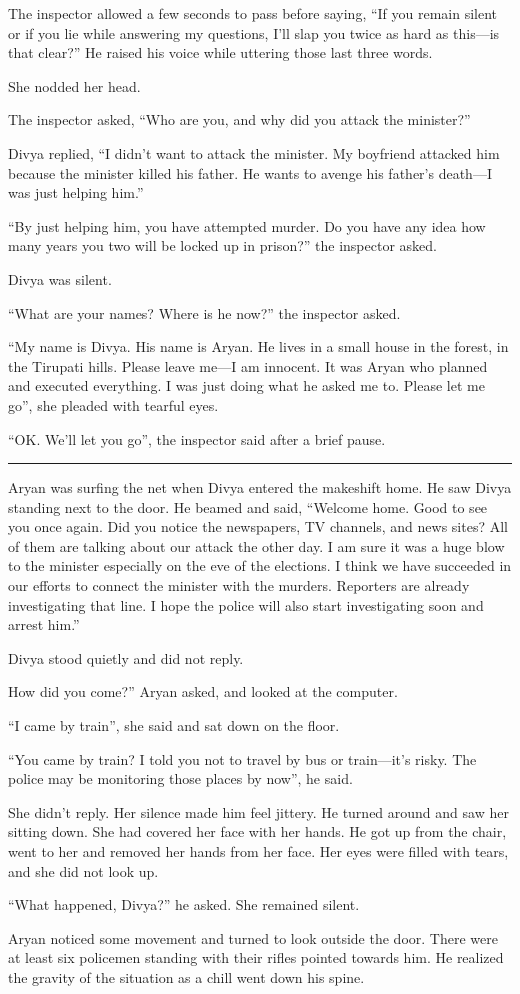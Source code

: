 The inspector allowed a few seconds to pass before saying, “If you remain
silent or if you lie while answering my questions, I'll slap you twice as hard
as this—is that clear?” He raised his voice while uttering those last three
words.

She nodded her head.

The inspector asked, “Who are you, and why did you attack the minister?”

Divya replied, “I didn't want to attack the minister. My boyfriend attacked him
because the minister killed his father. He wants to avenge his father's death—I
was just helping him.”

“By just helping him, you have attempted murder. Do you have any idea how many
years you two will be locked up in prison?” the inspector asked.

Divya was silent.

“What are your names? Where is he now?” the inspector asked.

“My name is Divya. His name is Aryan. He lives in a small house in the forest, in
the Tirupati hills. Please leave me—I am innocent. It was Aryan who planned
and executed everything. I was just doing what he asked me to. Please let me
go”, she pleaded with tearful eyes.

“OK. We'll let you go”, the inspector said after a brief pause.

\fancybreak{* * *}

Aryan was surfing the net when Divya entered the makeshift home. He saw Divya
standing next to the door. He beamed and said, “Welcome home. Good to see you
once again. Did you notice the newspapers, TV channels, and news sites? All of
them are talking about our attack the other day. I am sure it was a huge blow
to the minister especially on the eve of the elections. I think we have succeeded in our
efforts to connect the minister with the murders. Reporters are already
investigating that line. I hope the police will also start investigating soon
and arrest him.”

Divya stood quietly and did not reply.

How did you come?” Aryan asked, and looked at the computer.

“I came by train”, she said and sat down on the floor.

“You came by train? I told you not to travel by bus or train—it's risky. The
police may be monitoring those places by now”, he said.

She didn't reply. Her silence made him feel jittery. He turned around and saw
her sitting down. She had covered her face with her hands. He got up from the
chair, went to her and removed her hands from her face. Her eyes were filled
with tears, and she did not look up.

“What happened, Divya?” he asked. She remained silent.

Aryan noticed some movement and turned to look outside the door. There were
at least six policemen standing with their rifles pointed towards him. He
realized the gravity of the situation as a chill went down his spine.
